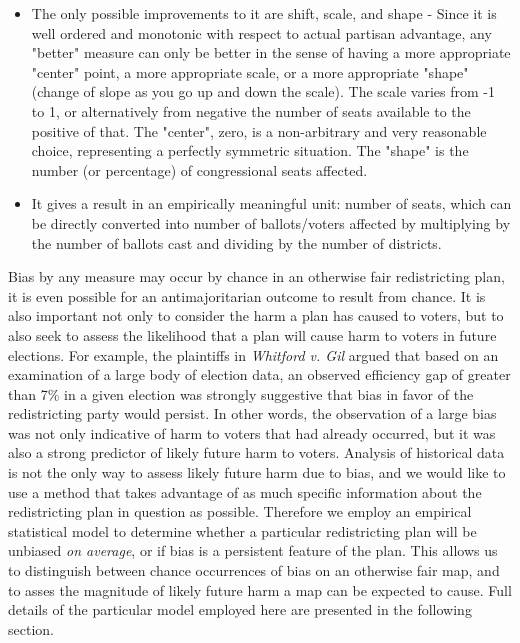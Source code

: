 \documentclass[preprint,12pt]{article}
\begin{document}
\begin{itemize}
\item The only possible improvements to it are shift, scale, and shape - Since it is well ordered and monotonic with respect to actual partisan advantage, any "better" measure can only be better in the sense of having a more appropriate "center" point, a more appropriate scale, or a more appropriate "shape" (change of slope as you go up and down the scale).  The scale varies from -1 to 1, or alternatively from negative the number of seats available to the positive of that.  The "center",  zero, is a non-arbitrary and very reasonable choice, representing a perfectly symmetric situation.   The "shape" is the number (or percentage) of congressional seats affected.

\item It gives a result in an empirically meaningful unit: number of seats, which can be directly converted into number of ballots/voters affected by multiplying by the number of ballots cast and dividing by the number of districts.

\end{itemize}

Bias by any measure may occur by chance in an otherwise fair redistricting plan, it is even possible for an antimajoritarian outcome to result from chance.
It is also important not only to consider the harm a plan has caused to voters, but to also seek to assess the likelihood that a plan will cause harm to voters in future elections.
For example, the plaintiffs in \emph{Whitford v. Gil} argued that based on an examination of a large body of election data, an observed efficiency gap of greater than 7\% in a given election was strongly suggestive that bias in favor of the redistricting party would persist.
In other words, the observation of a large bias was not only indicative of harm to voters that had already occurred, but it was also a strong predictor of likely future harm to voters.
Analysis of historical data is not the only way to assess likely future harm due to bias, and we would like to use a method that takes advantage of as much specific information about the redistricting plan in question as possible.
Therefore we employ an empirical statistical model to determine whether a particular redistricting plan will be unbiased \emph{on average}, or if bias is a persistent feature of the plan.
This allows us to distinguish between chance occurrences of bias on an otherwise fair map, and to asses the magnitude of likely future harm a map can be expected to cause. 
Full details of the particular model employed here are presented in the following section.
\end{document}
